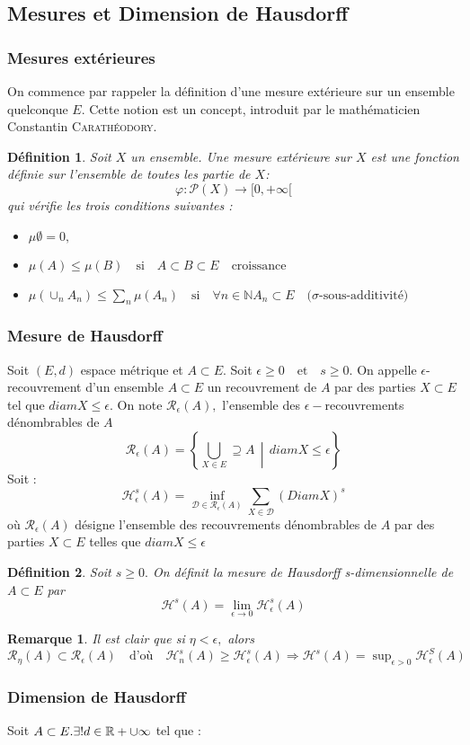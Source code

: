 \documentclass[12pt,a4paper]{report}
\theoremstyle{plain}
\newtheorem{definition}{Définition}
\newtheorem*{rmq}{Remarque}
\newcommand{\enstq}[2]{\left\{#1\,\middle|\,#2\right\}}
\newcommand{\ensnombre}[1]{\mathbb{#1}}
\newcommand{\N}[1]{\ensnombre{N}}
\newcommand{\R}[1]{\ensnombre{R}}
\newcommand{\textm}[1]{\quad \text{#1} \quad}
\begin{document}
	\subsection{Mesures et Dimension de Hausdorff}
	\subsubsection{Mesures extérieures}
On commence par rappeler la définition d'une mesure extérieure sur un ensemble quelconque $E$. Cette notion est un concept, introduit par le mathématicien Constantin \textsc{Carathéodory}. 

\begin{definition}
Soit $X$ un ensemble. Une mesure extérieure sur $X$ est une fonction définie sur l'ensemble de toutes les partie de $X$:
\[\varphi : \mathcal{P}(X) \longrightarrow [0, +\infty[\]
qui vérifie les trois conditions suivantes :
\begin{itemize}
\item $\mu \emptyset = 0,$
\item $\mu(A)\leq \mu (B) \textm{si} A\subset B \subset E \textm{croissance}$
\item $\mu (\cup_n A_n) \leq \sum_n \mu (A_n) \textm{si} \forall n \in \N, A_n \subset E \textm{($\sigma$-sous-additivité)}$
\end{itemize}
\end{definition}

	\subsubsection{Mesure de Hausdorff}
Soit $(E,d)$ espace métrique et $A \subset E.$ Soit $\epsilon \geq 0 \textm{et} s \geq 0.$ On appelle $\epsilon$-recouvrement d'un ensemble $A \subset E$ un recouvrement de $A$ par des parties $X \subset E$ tel que $diam X \leq \epsilon.$ On note $\mathcal{R}_\epsilon(A),$ l'ensemble des $\epsilon-$recouvrements dénombrables de $A$
\[\mathcal{R}_\epsilon (A)= \enstq{\bigcup_{X \in E}\supseteq A}{diam X \leq \epsilon}\]
Soit :
\[\mathcal{H}_\epsilon^s (A) = \inf_{\mathcal{D}\in \mathcal{R}_\epsilon(A)}\sum_{X \in \mathcal{D}}(Diam X)^s\]
où $\mathcal{R}_\epsilon (A)$ désigne l'ensemble des recouvrements dénombrables de $A$ par des parties $X \subset E$ telles que $diam X \leq \epsilon$

\begin{definition}
Soit $s \geq 0.$ On définit la mesure de Hausdorff s-dimensionnelle de $A \subset E$ par
\[\mathcal{H}^s(A) = \lim\limits_{\epsilon \rightarrow 0} \mathcal{H}_\epsilon^s(A)\]
\end{definition}
\begin{rmq}
Il est clair que si $\eta < \epsilon,$ alors $\mathcal{R}_\eta (A) \subset \mathcal{R}_\epsilon(A) \textm{d'où} 
\mathcal{H}_n^s(A)\geq\mathcal{H}_\epsilon^s(A) \Rightarrow \mathcal{H}^s(A) = \sup_{\epsilon > 0}\mathcal{H}_\epsilon^S(A)$
\end{rmq}
\subsubsection*{Dimension de Hausdorff}
Soit $A \subset E. \exists !d \in \R_+\cup {\infty}$ tel que :
\end{document}
